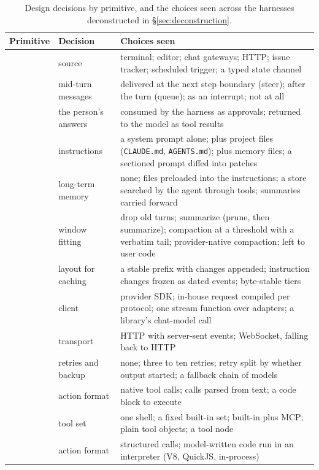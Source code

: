 \begin{table}[t]
\centering
\small
\setlength{\tabcolsep}{4pt}
\caption{Design decisions by primitive, and the choices seen across the harnesses deconstructed in \S\ref{sec:deconstruction}.}
\label{tab:decisions}
\begin{tabularx}{\linewidth}{@{}l>{\raggedright\arraybackslash}p{3.1cm}Y@{}}
\toprule
Primitive & Decision & Choices seen \\
\midrule
{} & source & terminal; editor; chat gateways; HTTP; issue tracker; scheduled trigger; a typed state channel \\
 & mid-turn messages & delivered at the next step boundary (steer); after the turn (queue); as an interrupt; not at all \\
 & the person's answers & consumed by the harness as approvals; returned to the model as tool results \\
\addlinespace
{} & instructions & a system prompt alone; plus project files (\texttt{CLAUDE.md}, \texttt{AGENTS.md}); plus memory files; a sectioned prompt diffed into patches \\
 & long-term memory & none; files preloaded into the instructions; a store searched by the agent through tools; summaries carried forward \\
 & window fitting & drop old turns; summarize (prune, then summarize); compaction at a threshold with a verbatim tail; provider-native compaction; left to user code \\
 & layout for caching & a stable prefix with changes appended; instruction changes frozen as dated events; byte-stable tiers \\
\addlinespace
{} & client & provider SDK; in-house request compiled per protocol; one stream function over adapters; a library's chat-model call \\
 & transport & HTTP with server-sent events; WebSocket, falling back to HTTP \\
 & retries and backup & none; three to ten retries; retry split by whether output started; a fallback chain of models \\
 & action format & native tool calls; calls parsed from text; a code block to execute \\
\addlinespace
{} & tool set & one shell; a fixed built-in set; built-in plus MCP; plain tool objects; a tool node \\
 & action format & structured calls; model-written code run in an interpreter (V8, QuickJS, in-process) \\

\end{tabularx}
\end{table}
